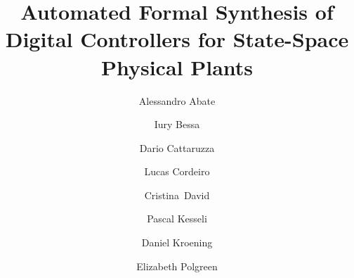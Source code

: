 \documentclass[runningheads,a4paper]{llncs}
\begin{document}
\newcommand\tool{{\sf DSSynth}\xspace}

\mainmatter  %

\title{Automated Formal Synthesis of Digital Controllers for State-Space Physical Plants} 


%
%
%


%
%


\author{%
Alessandro Abate \and
Iury Bessa \and
Dario Cattaruzza \and
Lucas Cordeiro \and
\mbox{Cristina David} \and
Pascal Kesseli \and
Daniel Kroening \and
Elizabeth Polgreen}
\end{document}
